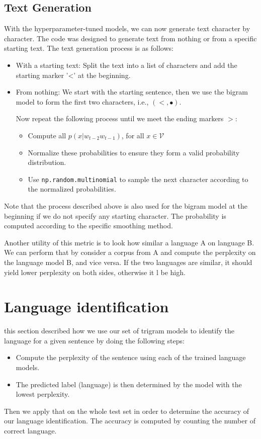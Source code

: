 \subsection{Text Generation}
With the hyperparameter-tuned models, we can now generate text character by character. The code was designed to generate text from nothing or from a specific starting text. The text generation process is as follows:
\begin{itemize}
\item With a starting text: Split the text into a list of characters and add the starting marker '<' at the beginning.
\item From nothing: We start with the starting sentence, then we use the bigram model to form the first two characters, i.e., $(<, \bullet)$.

Now repeat the following process until we meet the ending markers $>$:
\begin{itemize}
\item Compute all $p(x|w_{t-2}w_{t-1})$, for all $x\in\mathcal{V}$
\item Normalize these probabilities to ensure they form a valid probability distribution.
\item Use \texttt{np.random.multinomial} to sample the next character according to the normalized probabilities.
\end{itemize}
\end{itemize}
Note that the process described above is also used for the bigram model at the beginning if we do not specify any starting character.
The probability is computed according to the specific smoothing method.


Another utility of this metric is to look how similar a language A on language B. We can perform that by consider a corpus from A and compute the perplexity on the language model B, and vice versa. If the two languages are similar, it should yield lower perplexity on both sides, otherwise it l be high.
\section{Language identification}
this section described how we use our set of trigram models to identify the language for a given sentence by doing the following steps:
\begin{itemize}
    \item Compute the perplexity of the sentence using each of the trained language models.
    \item The predicted label (language) is then determined by the model with the lowest perplexity.
\end{itemize}
Then we apply that on the whole test set in order to determine the accuracy of our language identification. The accuracy is computed by counting the number of correct language.
